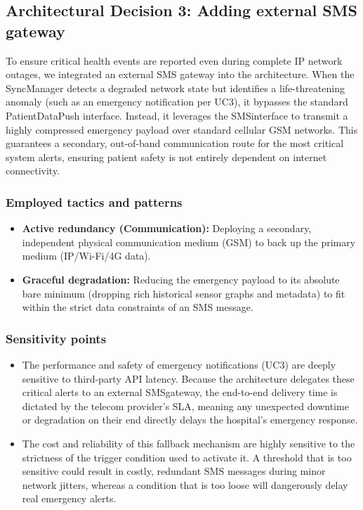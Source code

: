 \subsection*{Architectural Decision 3: Adding external SMS gateway}
To ensure critical health events are reported even during complete IP network outages, we integrated an external SMS gateway into the architecture. When the SyncManager detects a degraded network state but identifies a life-threatening anomaly (such as an emergency notification per UC3), it bypasses the standard PatientDataPush interface. Instead, it leverages the SMSinterface to transmit a highly compressed emergency payload over standard cellular GSM networks. This guarantees a secondary, out-of-band communication route for the most critical system alerts, ensuring patient safety is not entirely dependent on internet connectivity.
\subsubsection*{Employed tactics and patterns}
\begin{itemize}
	\item \textbf{Active redundancy (Communication):} Deploying a secondary, independent physical communication medium (GSM) to back up the primary medium (IP/Wi-Fi/4G data).
	\item \textbf{Graceful degradation:} Reducing the emergency payload to its absolute bare minimum (dropping rich historical sensor graphs and metadata) to fit within the strict data constraints of an SMS message.
\end{itemize}

\subsubsection*{Sensitivity points}
\begin{itemize}
	\item The performance and safety of emergency notifications (UC3) are deeply sensitive to third-party API latency. Because the architecture delegates these critical alerts to an external SMSgateway, the end-to-end delivery time is dictated by the telecom provider's SLA, meaning any unexpected downtime or degradation on their end directly delays the hospital's emergency response.
	\item The cost and reliability of this fallback mechanism are highly sensitive to the strictness of the trigger condition used to activate it. A threshold that is too sensitive could result in costly, redundant SMS messages during minor network jitters, whereas a condition that is too loose will dangerously delay real emergency alerts.
\end{itemize}

